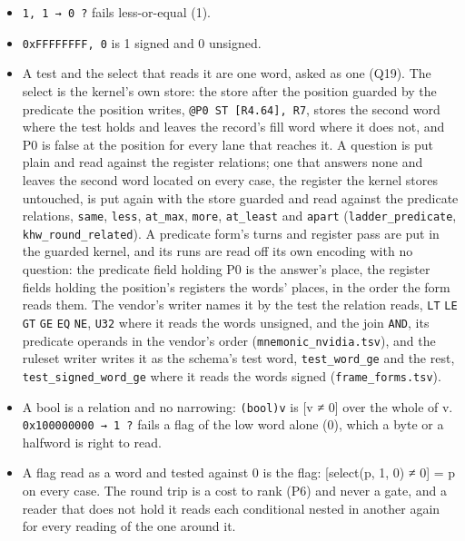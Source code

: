 \begin{itemize}
\item \texttt{1, 1 → 0 ?} fails less-or-equal (1).
\item \texttt{0x\allowbreak{}FFFFFFFF, 0} is 1 signed and 0 unsigned.
\item A test and the select that reads it are one word, asked as one (Q19). The select is the kernel's own store: the store after the position guarded by the predicate the position writes, \texttt{@P0 ST [R4.\allowbreak{}64], R7}, stores the second word where the test holds and leaves the record's fill word where it does not, and P0 is false at the position for every lane that reaches it. A question is put plain and read against the register relations; one that answers none and leaves the second word located on every case, the register the kernel stores untouched, is put again with the store guarded and read against the predicate relations, \texttt{same}, \texttt{less}, \texttt{at\_\allowbreak{}max}, \texttt{more}, \texttt{at\_\allowbreak{}least} and \texttt{apart} (\texttt{ladder\_\allowbreak{}predicate}, \texttt{khw\_\allowbreak{}round\_\allowbreak{}related}). A predicate form's turns and register pass are put in the guarded kernel, and its runs are read off its own encoding with no question: the predicate field holding P0 is the answer's place, the register fields holding the position's registers the words' places, in the order the form reads them. The vendor's writer names it by the test the relation reads, \texttt{LT} \texttt{LE} \texttt{GT} \texttt{GE} \texttt{EQ} \texttt{NE}, \texttt{U32} where it reads the words unsigned, and the join \texttt{AND}, its predicate operands in the vendor's order (\texttt{mnemonic\_\allowbreak{}nvidia.\allowbreak{}tsv}), and the ruleset writer writes it as the schema's test word, \texttt{test\_\allowbreak{}word\_\allowbreak{}ge} and the rest, \texttt{test\_\allowbreak{}signed\_\allowbreak{}word\_\allowbreak{}ge} where it reads the words signed (\texttt{frame\_\allowbreak{}forms.\allowbreak{}tsv}).
\item A bool is a relation and no narrowing: \texttt{(bool)v} is [v ≠ 0] over the whole of v. \texttt{0x100000000 → 1 ?} fails a flag of the low word alone (0), which a byte or a halfword is right to read.
\item A flag read as a word and tested against 0 is the flag: [select(p, 1, 0) ≠ 0] = p on every case. The round trip is a cost to rank (P6) and never a gate, and a reader that does not hold it reads each conditional nested in another again for every reading of the one around it.
\end{itemize}

